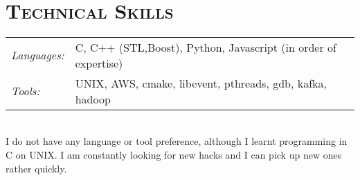 \begin{resume}

\begin{formatb}
   \body\\
\end{formatb}
\section{\textsc{Technical Skills}}
\begin{tabular}{ l l }
\textit{Languages:}&C, C++ (STL,Boost), Python, Javascript  (in order of expertise) \\
\textit{Tools:}&UNIX, AWS, cmake, libevent, pthreads, gdb, kafka, hadoop\\
\end{tabular}\\
I do not have any language or tool preference, although I learnt programming in C on UNIX. I am constantly looking for new hacks and I can pick up new ones rather quickly. \\



\end{resume}
